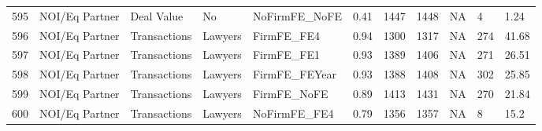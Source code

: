 \begin{table}[ht]
\begin{tabular}{rllllllllll}
  595 & NOI/Eq Partner & Deal Value & No & NoFirmFE\_NoFE & 0.41 & 1447 & 1448 & NA & 4 & 1.24 \\ 
  596 & NOI/Eq Partner & Transactions & Lawyers & FirmFE\_FE4 & 0.94 & 1300 & 1317 & NA & 274 & 41.68 \\ 
  597 & NOI/Eq Partner & Transactions & Lawyers & FirmFE\_FE1 & 0.93 & 1389 & 1406 & NA & 271 & 26.51 \\ 
  598 & NOI/Eq Partner & Transactions & Lawyers & FirmFE\_FEYear & 0.93 & 1388 & 1408 & NA & 302 & 25.85 \\ 
  599 & NOI/Eq Partner & Transactions & Lawyers & FirmFE\_NoFE & 0.89 & 1413 & 1431 & NA & 270 & 21.84 \\ 
  600 & NOI/Eq Partner & Transactions & Lawyers & NoFirmFE\_FE4 & 0.79 & 1356 & 1357 & NA & 8 & 15.2 \\ 
   \hline
\end{tabular}
\end{table}
